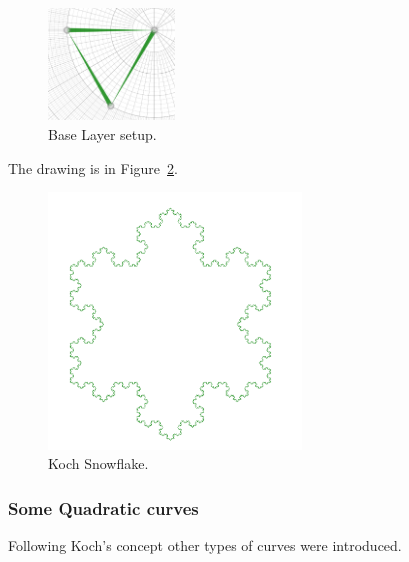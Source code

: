             \begin{figure}[ht]
                \caption{\label{snowflake_setup03} Base Layer setup.}
                \centering
                \includegraphics[width=0.3\textwidth]{img/snowflake_setup03.png}
            \end{figure}

            The drawing is in Figure~\ref{snowflake_draw}.

            \begin{figure}[ht]
                \caption{\label{snowflake_draw} Koch Snowflake.}
                \centering
                \includegraphics[width=0.6\textwidth]{img/snowflake_draw.png}
            \end{figure}

            \FloatBarrier

        \subsubsection{Some Quadratic curves}

            Following Koch's concept other types of curves were introduced.

